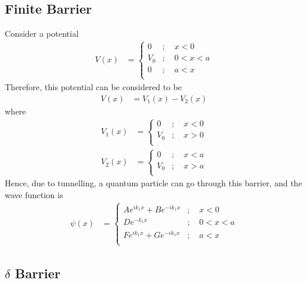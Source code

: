 \documentclass[titlepage, fleqn, a4paper, 12pt, twoside]{article}
\theoremstyle{definition}
\theoremstyle{theorem}
\begin{document}
\subsection{Finite Barrier}

Consider a potential
\begin{align*}
	V(x) &=
		\begin{cases}
			0 &;\quad x < 0\\
			V_0 &;\quad 0 < x < a\\
			0 &;\quad a < x\\
		\end{cases}
\end{align*}
Therefore, this potential can be considered to be
\begin{align*}
	V(x) &= V_1(x) - V_2(x)
\end{align*}
where
\begin{align*}
	V_1(x) &=
		\begin{cases}
			0 &;\quad x < 0\\
			V_0 &;\quad x > 0\\
		\end{cases}\\
	V_2(x) &=
		\begin{cases}
			0 &;\quad x < a\\
			V_0 &;\quad x > a\\
		\end{cases}
\end{align*}
Hence, due to tunnelling, a quantum particle can go through this barrier, and the wave function is
\begin{align*}
	\psi(x) &=
		\begin{cases}
			A e^{i k_1 x} + B e^{-i k_1 x} &;\quad x < 0\\
			D e^{-k_1 x} &;\quad 0 < x < a\\
			F e^{i k_1 x} + G e^{-i k_1 x} &;\quad a < x\\
		\end{cases}
\end{align*}

\subsection{$\delta$ Barrier}
\end{document}
